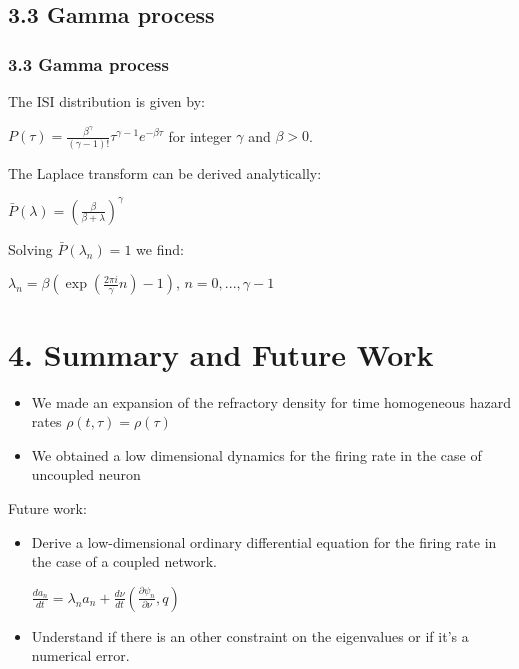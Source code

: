 \documentclass{beamer}
\begin{document}
\subsection{3.3 Gamma process}
\begin{frame}
\frametitle{3.3 Gamma process}

The ISI distribution is given by: 	

\vspace{0.2cm}
\hspace{2.5cm}$P(\tau)=\frac{\beta^\gamma}{(\gamma-1)!}\tau^{\gamma-1}e^{-\beta\tau}$ for integer $\gamma$ and $\beta>0$. 

\pause
\vspace{0.3cm}
The Laplace transform can be derived analytically:

\vspace{0.2cm}
\hspace{2.5cm}$\bar{P}(\lambda)=(\frac{\beta}{\beta+\lambda})^\gamma$

\pause
\vspace{0.3cm}
Solving $\bar{P}(\lambda_n)=1$ we find:

\vspace{0.2cm}
\hspace{2.8cm} $\lambda_n=\beta(\exp(\frac{2\pi i}{\gamma}n)-1)$, $n=0,..., \gamma-1$

\end{frame}




\section{4. Summary and Future Work}
\begin{frame}
\begin{itemize}
	\frametitle{4. Summary and Future Work}
	\item 	We made an expansion of the refractory density for time homogeneous hazard rates $\rho(t,\tau)=\rho(\tau)$ 
	\pause
	\item We obtained a low dimensional dynamics for the firing rate in the case of uncoupled neuron
\end{itemize}
\pause
Future work:
\begin{itemize}
	
	\item Derive a low-dimensional ordinary differential equation for the firing rate in the case of a coupled network.
	
	\hspace{2cm} $\frac{d a_n}{dt}= \lambda_na_n+\frac{d\nu}{dt}(\frac{\partial \psi_n}{\partial \nu},q)$
	\pause
	\item Understand if there is an other constraint on the eigenvalues or if it's a numerical error. 


\end{itemize}




\end{frame}
\end{document}
